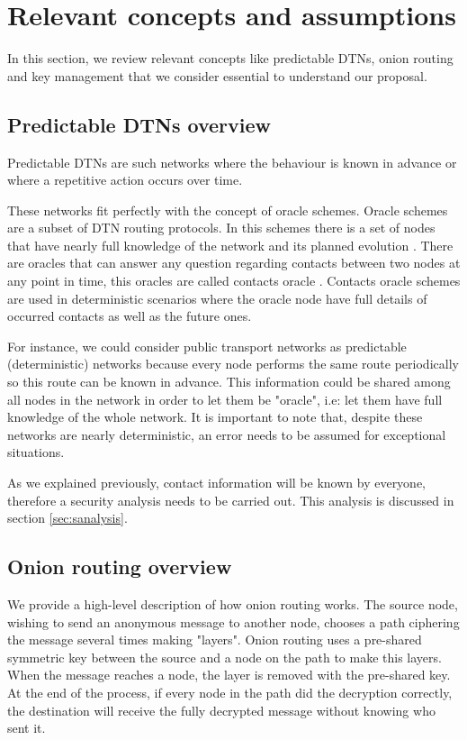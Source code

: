 \section{Relevant concepts and assumptions}\label{sec:relevant-concepts}

In this section, we review relevant concepts like predictable DTNs, onion routing and key management that we consider essential to understand our proposal.

\subsection{Predictable DTNs overview}

Predictable DTNs are such networks where the behaviour is known in advance or where a repetitive action occurs over time.

These networks fit perfectly with the concept of oracle schemes. Oracle schemes are a subset of DTN routing protocols. In this schemes there is a set of nodes that have nearly full knowledge of the network and its planned evolution \cite{dtn-book}. There are oracles that can answer any question regarding contacts between two nodes at any point in time, this oracles are called contacts oracle \cite{oracle-types}. Contacts oracle schemes are used in deterministic scenarios where the oracle node have full details of occurred contacts as well as the future ones.

For instance, we could consider public transport networks as predictable (deterministic) networks because every node performs the same route periodically so this route can be known in advance. This information could be shared among all nodes in the network in order to let them be "oracle", i.e: let them have full knowledge of the whole network. It is important to note that, despite these networks are nearly deterministic, an error needs to be assumed for exceptional situations.

As we explained previously, contact information will be known by everyone, therefore a security analysis needs to be carried out. This analysis is discussed in section \ref{sec:sanalysis}.

\subsection{Onion routing overview}

We provide a high-level description of how onion routing works. The source node, wishing to send an anonymous message to another node, chooses a path ciphering the message several times making "layers". Onion routing uses a pre-shared symmetric key between the source and a node on the path to make this layers. When the message reaches a node, the layer is removed with the pre-shared key. At the end of the process, if every node in the path did the decryption correctly, the destination will receive the fully decrypted message without knowing who sent it.

